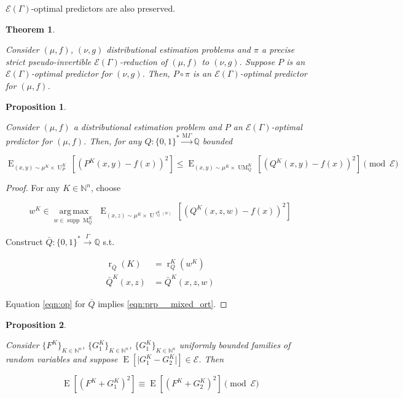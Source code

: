 \documentclass{article}
\numberwithin{equation}{section}
\theoremstyle{definition}
\theoremstyle{plain}
\newtheorem{theorem}{Theorem}[section]
\newtheorem{proposition}{Proposition}[section]
\newcommand{\Bool}{\{0,1\}}
\newcommand{\Words}{{\Bool^*}}
\DeclareMathOperator{\Supp}{supp}
\DeclareMathOperator{\E}{E}
\DeclareMathOperator{\R}{r}
\DeclareMathOperator{\M}{M}
\DeclareMathOperator{\UM}{UM}
\DeclareMathOperator{\Un}{U}
\newcommand{\Argmax}[1]{\underset{#1}{\operatorname{arg\,max}}\,}
\newcommand{\Nats}{\mathbb{N}}
\newcommand{\Rats}{\mathbb{Q}}
\newcommand{\Abs}[1]{\lvert #1 \rvert}
\newcommand{\MGrow}{\mathrm{M}\Gamma}
\newcommand{\Fall}{\mathcal{E}}
\newcommand{\EG}{\Fall(\Gamma)}
\newcommand{\Scheme}{\xrightarrow{\Gamma}}
\newcommand{\MScheme}{\xrightarrow{\MGrow}}
\begin{document}
$\EG$-optimal predictors are also preserved.

\begin{samepage}
\begin{theorem}
\label{thm:psp_reduce}

Consider $(\mu,f)$, $(\nu,g)$ distributional estimation problems and $\pi$ a precise strict pseudo-invertible $\EG$-reduction of $(\mu, f)$ to $(\nu, g)$. Suppose $P$ is an $\EG$-optimal predictor for $(\nu, g)$. Then, $P \circ \pi$ is an $\EG$-optimal predictor for $(\mu, f)$.

\end{theorem}
\end{samepage}

\begin{samepage}
\begin{proposition}
\label{prp:mixed_opt}

Consider ${(\mu,f)}$ a distributional estimation problem and ${P}$ an ${\EG}$-optimal predictor for ${(\mu,f)}$. Then, for any $Q: \Words \MScheme \Rats$ bounded

\begin{equation}
\label{eqn:prp__mixed_ort}
\E_{(x,y) \sim \mu^{K} \times \Un_P^K}[(P^K(x,y) - f(x))^2] \leq \E_{(x,y) \sim \mu^{K} \times \UM_Q^K}[(Q^K(x,y)-f(x))^2] \pmod \Fall
\end{equation}

\end{proposition}
\end{samepage}

\begin{proof}

For any ${K \in \Nats^n}$, choose 

\[w^K \in \Argmax{w \in \Supp \M_Q^K} \E_{(x,z) \sim \mu^{K} \times \Un^{\R_Q^K(w)}}[(Q^K(x,z,w)-f(x))^2]\]

Construct ${\bar{Q}: \Words \Scheme \Rats}$ s.t.

\begin{align*}
\R_{\bar{Q}}(K) &= \R_Q^K(w^K) \\
\bar{Q}^K(x,z) &= \bar{Q}^K(x,z,w)
\end{align*}

Equation \ref{eqn:op} for ${\bar{Q}}$ implies \ref{eqn:prp__mixed_ort}.
%
\end{proof}

\begin{samepage}
\begin{proposition}
\label{prp:sq_diff_cong}

Consider $\{F^K\}_{K \in \Nats^n}$, $\{G_1^K\}_{K \in \Nats^n}$, $\{G_1^K\}_{K \in \Nats^n}$ uniformly bounded families of random variables and suppose ${\E[\Abs{G_1^K - G_2^K}] \in \Fall}$. Then

\begin{equation}
\E[(F^K + G_1^K)^2] \equiv \E[(F^K + G_2^K)^2] \pmod \Fall
\end{equation}

\end{proposition}
\end{samepage}
\end{document}
